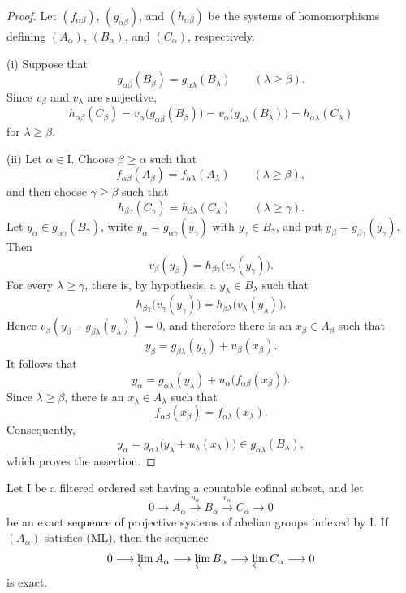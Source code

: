 \begin{proof}
Let $(f_{\alpha\beta})$, $(g_{\alpha\beta})$, and
$(h_{\alpha\beta})$ be the systems of homomorphisms defining
$(A_\alpha)$, $(B_\alpha)$, and $(C_\alpha)$, respectively.

(i) Suppose that
\[
  g_{\alpha\beta}(B_\beta)
  =
  g_{\alpha\lambda}(B_\lambda)
  \qquad(\lambda\geq\beta).
\]
Since $v_\beta$ and $v_\lambda$ are surjective,
\[
  h_{\alpha\beta}(C_\beta)
  =
  v_\alpha\bigl(g_{\alpha\beta}(B_\beta)\bigr)
  =
  v_\alpha\bigl(g_{\alpha\lambda}(B_\lambda)\bigr)
  =
  h_{\alpha\lambda}(C_\lambda)
\]
for $\lambda\geq\beta$.

(ii) Let $\alpha\in\mathrm{I}$.
Choose $\beta\geq\alpha$ such that
\[
  f_{\alpha\beta}(A_\beta)
  =
  f_{\alpha\lambda}(A_\lambda)
  \qquad(\lambda\geq\beta),
\]
and then choose $\gamma\geq\beta$ such that
\[
  h_{\beta\gamma}(C_\gamma)
  =
  h_{\beta\lambda}(C_\lambda)
  \qquad(\lambda\geq\gamma).
\]
Let $y_\alpha\in g_{\alpha\gamma}(B_\gamma)$, write
$y_\alpha=g_{\alpha\gamma}(y_\gamma)$ with $y_\gamma\in B_\gamma$,
and put $y_\beta=g_{\beta\gamma}(y_\gamma)$.
Then
\[
  v_\beta(y_\beta)
  =
  h_{\beta\gamma}\bigl(v_\gamma(y_\gamma)\bigr).
\]
For every $\lambda\geq\gamma$, there is, by hypothesis, a
$y_\lambda\in B_\lambda$ such that
\[
  h_{\beta\gamma}\bigl(v_\gamma(y_\gamma)\bigr)
  =
  h_{\beta\lambda}\bigl(v_\lambda(y_\lambda)\bigr).
\]
Hence
$v_\beta(y_\beta-g_{\beta\lambda}(y_\lambda))=0$, and therefore
there is an $x_\beta\in A_\beta$
such that
\[
  y_\beta
  =
  g_{\beta\lambda}(y_\lambda)+u_\beta(x_\beta).
\]
It follows that
\[
  y_\alpha
  =
  g_{\alpha\lambda}(y_\lambda)
  +
  u_\alpha\bigl(f_{\alpha\beta}(x_\beta)\bigr).
\]
Since $\lambda\geq\beta$, there is an $x_\lambda\in A_\lambda$ such
that
\[
  f_{\alpha\beta}(x_\beta)=f_{\alpha\lambda}(x_\lambda).
\]
Consequently,
\[
  y_\alpha
  =
  g_{\alpha\lambda}
  \bigl(y_\lambda+u_\lambda(x_\lambda)\bigr)
  \in g_{\alpha\lambda}(B_\lambda),
\]
which proves the assertion.
\end{proof}

\begin{proposition}[13.2.2]
\label{0.13.2.2}
Let $\mathrm{I}$ be a filtered ordered set having a countable
cofinal subset, and let
\[
  0\longrightarrow A_\alpha
  \xrightarrow{u_\alpha}B_\alpha
  \xrightarrow{v_\alpha}C_\alpha
  \longrightarrow0
\]
be an exact sequence of projective systems of abelian groups indexed
by $\mathrm{I}$.
If $(A_\alpha)$ satisfies {\rm(ML)}, then the sequence
\[
  0\longrightarrow\varprojlim A_\alpha
  \longrightarrow\varprojlim B_\alpha
  \longrightarrow\varprojlim C_\alpha
  \longrightarrow0
\]
is exact.
\end{proposition}

